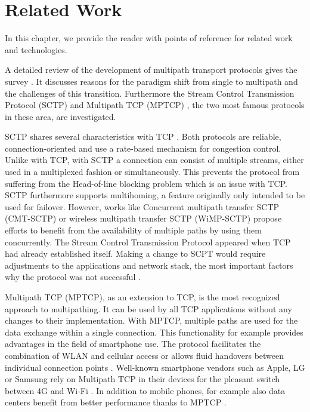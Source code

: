\chapter{Related Work}
\label{chap:RelatedWork}

In this chapter, we provide the reader with points of reference for related work and technologies. %

A detailed review of the development of multipath transport protocols gives the survey \cite{MultiPathSurvey}. It discusses reasons for the paradigm shift from single to multipath and the challenges of this transition. Furthermore the Stream Control Transmission Protocol (SCTP) \cite{SCTPWiki, rfc4960} and Multipath TCP (MPTCP) \cite{Barre2011, Raiciu2012, MPTCPWebMain,rfc6824}, the two most famous protocols in these area, are investigated.

SCTP shares several characteristics with TCP \cite{rfc793}. Both protocols are reliable, connection-oriented and use a rate-based mechanism for congestion control. Unlike with TCP, with SCTP a connection can consist of multiple streams, either used in a multiplexed fashion or simultaneously. This prevents the protocol from suffering from the Head-of-line blocking problem \cite{HOLBlocking} which is an issue with TCP. SCTP furthermore supports multihoming, a feature originally only intended to be used for failover. However, works like Concurrent multipath transfer SCTP (CMT-SCTP) \cite{1709949} or wireless multipath transfer SCTP (WiMP-SCTP) \cite{8205908} propose efforts to benefit from the availability of multiple paths by using them concurrently. The Stream Control Transmission Protocol appeared when TCP had already established itself. Making a change to SCPT would require adjustments to the applications and network stack, the most important factors why the protocol was not successful \cite{WhyNotSCTP}.

Multipath TCP (MPTCP), as an extension to TCP, is the most recognized approach to multipathing. It can be used by all TCP applications without any changes to their implementation. With MPTCP, multiple paths are used for the data exchange within a single connection. This functionality for example provides advantages in the field of smartphone use. The protocol facilitates the combination of WLAN and cellular access \cite{MPTCPStudyWirelessAndCellular} or allows fluid handovers between individual connection points \cite{MPTCPStudyHandover}. Well-known smartphone vendors such as Apple, LG or Samsung rely on Multipath TCP in their devices for the pleasant switch between 4G and Wi-Fi \cite{MPTCPInSmartphones}. In addition to mobile phones, for example also data centers benefit from better performance thanks to MPTCP \cite{RBPGWH11}.

